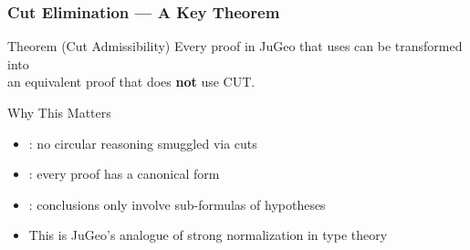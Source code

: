 \begin{frame}
\frametitle{Cut Elimination --- A Key Theorem}
\begin{center}
\end{center}
\vspace{6pt}
\begin{block}{Theorem (Cut Admissibility)}
  Every proof in JuGeo that uses  can be transformed into\\
  an equivalent proof that does \textbf{not} use CUT.
\end{block}
\vspace{4pt}
\begin{exampleblock}{Why This Matters}
  \begin{itemize}
    \item {}: no circular reasoning smuggled via cuts
    \item {}: every proof has a canonical form
    \item {}: conclusions only involve sub-formulas of hypotheses
    \item This is JuGeo's analogue of strong normalization in type theory
  \end{itemize}
\end{exampleblock}
\end{frame}
